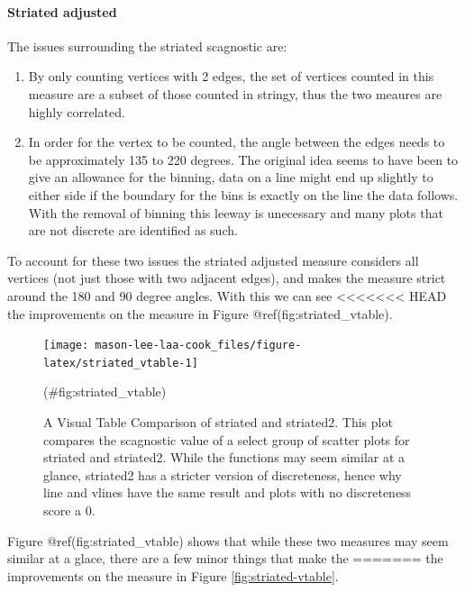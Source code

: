 \hypertarget{striated-adjusted}{%
\paragraph{Striated adjusted}\label{striated-adjusted}}

The issues surrounding the striated scagnostic are:

\begin{enumerate}
\def\labelenumi{\arabic{enumi}.}
\item
  By only counting vertices with 2 edges, the set of vertices counted in
  this measure are a subset of those counted in stringy, thus the two
  meaures are highly correlated.
\item
  In order for the vertex to be counted, the angle between the edges
  needs to be approximately 135 to 220 degrees. The original idea seems
  to have been to give an allowance for the binning, data on a line
  might end up slightly to either side if the boundary for the bins is
  exactly on the line the data follows. With the removal of binning this
  leeway is unecessary and many plots that are not discrete are
  identified as such.
\end{enumerate}

To account for these two issues the striated adjusted measure considers
all vertices (not just those with two adjacent edges), and makes the
measure strict around the 180 and 90 degree angles. With this we can see
<<<<<<< HEAD
the improvements on the measure in Figure @ref(fig:striated\_vtable).

\begin{Schunk}
\begin{figure}
\texttt{[image: mason-lee-laa-cook\_files/figure-latex/striated\_vtable-1]} \caption[A Visual Table Comparison of striated and striated2]{A Visual Table Comparison of striated and striated2. This plot compares the scagnostic value of a select group of scatter plots for striated and striated2. While the functions may seem similar at a glance, striated2 has a stricter version of discreteness, hence why line and vlines have the same result and plots with no discreteness score a 0.}(\#fig:striated_vtable)
\end{figure}
\end{Schunk}

Figure @ref(fig:striated\_vtable) shows that while these two measures
may seem similar at a glace, there are a few minor things that make the
=======
the improvements on the measure in Figure \ref{fig:striated-vtable}.

